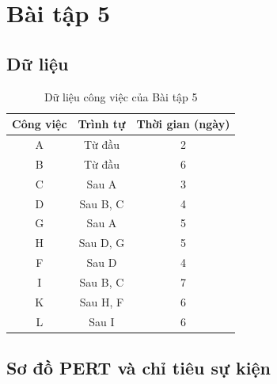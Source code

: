 \section{Bài tập 5}

\subsection{Dữ liệu}

\begin{table}[H]\centering
\caption{Dữ liệu công việc của Bài tập 5}
\begin{tabular}{c c c}
\toprule
\textbf{Công việc} & \textbf{Trình tự} & \textbf{Thời gian (ngày)}\\
\midrule
A & Từ đầu & 2\\
B & Từ đầu & 6\\
C & Sau A & 3\\
D & Sau B, C & 4\\
G & Sau A & 5\\
H & Sau D, G & 5\\
F & Sau D & 4\\
I & Sau B, C & 7\\
K & Sau H, F & 6\\
L & Sau I & 6\\
\bottomrule
\end{tabular}
\end{table}

\subsection{Sơ đồ PERT và chỉ tiêu sự kiện}

